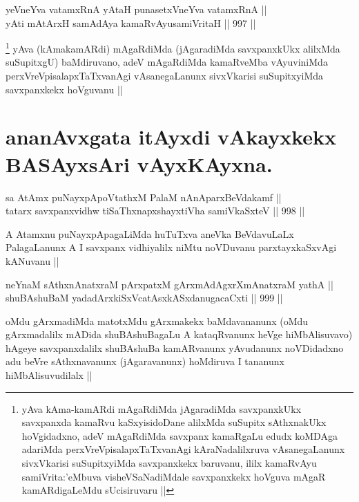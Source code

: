 
\begin{shl}
yeVneYva vatamxRnA yAtaH punasetxVneYva vatamxRnA || \\
yAti mAtArxH samAdAya kamaRvAyusamiVritaH ||  997 ||  
\end{shl}

\begin{artha}
\footnote{yAva kAma-kamARdi mAgaRdiMda jAgaradiMda savxpanxkUkx savxpanxda kamaRvu kaSxyisidoDane alilxMda suSupitx sAthxnakUkx hoVgidadxno, adeV mAgaRdiMda savxpanx kamaRgaLu edudx koMDAga adariMda perxVreVpisalapxTaTxvanAgi kAraNadalilxruva vAsanegaLanunx sivxVkarisi suSupitxyiMda savxpanxkekx baruvanu, ililx kamaRvAyu samiVrita:'eMbuva visheVSaNadiMdale savxpanxkekx hoVguva mAgaR kamARdigaLeMdu sUcisiruvaru ||}
yAva (kAmakamARdi) mAgaRdiMda (jAgaradiMda savxpanxkUkx alilxMda suSupitxgU) baMdiruvano, adeV mAgaRdiMda kamaRveMba vAyuviniMda perxVreVpisalapxTaTxvanAgi vAsanegaLanunx sivxVkarisi suSupitxyiMda savxpanxkekx hoVguvanu ||
\end{artha}

\section*{ananAvxgata itAyxdi vAkayxkekx BASAyxsAri vAyxKAyxna.}


\begin{shl}
sa AtAmx puNayxpApoVtathxM PalaM nAnAparxBeVdakamf || \\
tatarx savxpanxvidhw tiSaThxnapxshayxtiVha samiVkaSxteV ||  998 || 
\end{shl}

\begin{artha}
A Atamxnu puNayxpApagaLiMda huTuTxva aneVka BeVdavuLaLx PalagaLanunx A I savxpanx vidhiyalilx niMtu noVDuvanu parxtayxkaSxvAgi kANuvanu ||
\end{artha}


\begin{shl}
neYnaM sAthxnAnatxraM pArxpatxM gArxmAdAgxrXmAnatxraM yathA || \\
shuBAshuBaM yadadArxkiSxVcatAsxkASxdanugacaCxti ||  999 ||  
\end{shl}

\begin{artha}
oMdu gArxmadiMda matotxMdu gArxmakekx baMdavananunx (oMdu gArxmadalilx mADida shuBAshuBagaLu A kataqRvanunx heVge hiMbAlisuvavo) hAgeye savxpanxdalilx shuBAshuBa kamARvanunx yAvudanunx noVDidadxno adu beVre sAthxnavanunx (jAgaravanunx) hoMdiruva I tananunx hiMbAlisuvudilalx ||
\end{artha}

